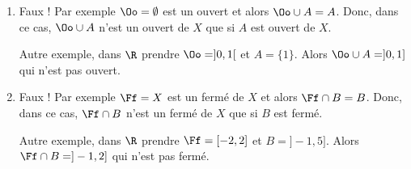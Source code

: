 \documentclass{article}
\begin{document}

\exercice{}

\begin{enumerate}
\item Faux !
Par exemple $\Oo = \emptyset$ est un ouvert et alors $\Oo \cup A = A$. Donc, dans ce cas, $\Oo \cup A$ n'est un ouvert de $X$ que si $A$ est ouvert de $X$.

Autre exemple, dans $\R$ prendre $\Oo = ]0,1[$ et $A = \{1\}$. Alors $\Oo \cup A = ]0,1]$ qui n'est pas ouvert.
\item Faux !
Par exemple $\Ff = X$ est un fermé de $X$ et alors $\Ff \cap B = B$. Donc, dans ce cas, $\Ff \cap B$ n'est un fermé de $X$ que si $B$ est fermé.

Autre exemple, dans $\R$ prendre $\Ff = [-2,2]$ et $B = ]-1,5]$. Alors $\Ff \cap B = ]-1,2]$ qui n'est pas fermé.
\end{enumerate}

\exercice{}
\end{document}
